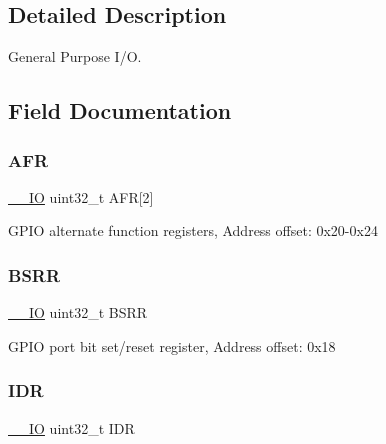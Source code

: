 \subsection{Detailed Description}
General Purpose I/O. 

\subsection{Field Documentation}
\mbox{\label{struct_g_p_i_o___type_def_ab67c1158c04450d19ad483dcd2192e43}} 
\subsubsection{\texorpdfstring{A\+FR}{AFR}}
{\footnotesize\ttfamily \mbox{\hyperlink{core__sc300_8h_aec43007d9998a0a0e01faede4133d6be}{\+\_\+\+\_\+\+IO}} uint32\+\_\+t A\+FR\mbox{[}2\mbox{]}}

G\+P\+IO alternate function registers, Address offset\+: 0x20-\/0x24 \mbox{\label{struct_g_p_i_o___type_def_ac25dd6b9e3d55e17589195b461c5ec80}} 
\subsubsection{\texorpdfstring{B\+S\+RR}{BSRR}}
{\footnotesize\ttfamily \mbox{\hyperlink{core__sc300_8h_aec43007d9998a0a0e01faede4133d6be}{\+\_\+\+\_\+\+IO}} uint32\+\_\+t B\+S\+RR}

G\+P\+IO port bit set/reset register, Address offset\+: 0x18 \mbox{\label{struct_g_p_i_o___type_def_a328d2fe9ef1d513c3a97d30f98f0047c}} 
\subsubsection{\texorpdfstring{I\+DR}{IDR}}
{\footnotesize\ttfamily \mbox{\hyperlink{core__sc300_8h_aec43007d9998a0a0e01faede4133d6be}{\+\_\+\+\_\+\+IO}} uint32\+\_\+t I\+DR}

